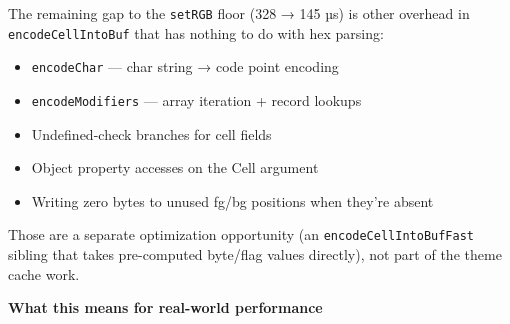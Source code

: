 The remaining gap to the \texttt{s\allowbreak{}e\allowbreak{}t\allowbreak{}R\allowbreak{}G\allowbreak{}B} floor (328 → 145 µs) is other overhead in \texttt{e\allowbreak{}n\allowbreak{}c\allowbreak{}o\allowbreak{}d\allowbreak{}e\allowbreak{}C\allowbreak{}e\allowbreak{}l\allowbreak{}l\allowbreak{}I\allowbreak{}n\allowbreak{}t\allowbreak{}o\allowbreak{}B\allowbreak{}u\allowbreak{}f} that has nothing to do with hex parsing:

\begin{itemize}
\tightlist
\item
  \texttt{e\allowbreak{}n\allowbreak{}c\allowbreak{}o\allowbreak{}d\allowbreak{}e\allowbreak{}C\allowbreak{}h\allowbreak{}a\allowbreak{}r} --- char string → code point encoding
\item
  \texttt{e\allowbreak{}n\allowbreak{}c\allowbreak{}o\allowbreak{}d\allowbreak{}e\allowbreak{}M\allowbreak{}o\allowbreak{}d\allowbreak{}i\allowbreak{}f\allowbreak{}i\allowbreak{}e\allowbreak{}r\allowbreak{}s} --- array iteration + record lookups
\item
  Undefined-check branches for cell fields
\item
  Object property accesses on the Cell argument
\item
  Writing zero bytes to unused fg/bg positions when they're absent
\end{itemize}

Those are a separate optimization opportunity (an \texttt{e\allowbreak{}n\allowbreak{}c\allowbreak{}o\allowbreak{}d\allowbreak{}e\allowbreak{}C\allowbreak{}e\allowbreak{}l\allowbreak{}l\allowbreak{}I\allowbreak{}n\allowbreak{}t\allowbreak{}o\allowbreak{}B\allowbreak{}u\allowbreak{}f\allowbreak{}F\allowbreak{}a\allowbreak{}s\allowbreak{}t} sibling that takes pre-computed byte/flag values directly), not part of the theme cache work.

\textbf{What this means for real-world performance}

